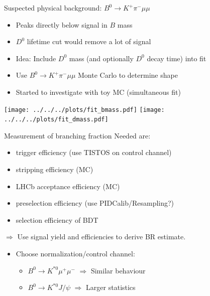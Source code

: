 \documentclass[compress,aspectratio=43]{beamer}
\begin{document}
\begin{frame}{Suspected physical background: $B^0\to K^+\pi^-\mu\mu$}
  \begin{itemize}
      \item Peaks directly below signal in $B$ mass
      \item $D^0$ lifetime cut would remove a lot of signal
      \item Idea: Include $D^0$ mass (and optionally $D^0$ decay time) into fit 
      \item Use $B^0\to K^+\pi^-\mu\mu$ Monte Carlo to determine shape
    \item Started to investigate with toy MC (simultaneous fit)
  \end{itemize}
  \centering
  \texttt{[image: ../../../plots/fit\_bmass.pdf]}
  \texttt{[image: ../../../plots/fit\_dmass.pdf]}
\end{frame}

\begin{frame}{Measurement of branching fraction}
  Needed are:
  \begin{itemize}
    \item trigger efficiency (use TISTOS on control channel)
    \item stripping efficiency (MC)
    \item LHCb acceptance efficiency (MC)
    \item preselection efficiency (use PIDCalib/Resampling?)
    \item selection efficiency of BDT
  \end{itemize}
  $\Rightarrow$ Use signal yield and efficiencies to derive BR estimate.
  \begin{itemize}
    \item Choose normalization/control channel:
      \begin{itemize}
        \item $B^0\to K^{*0}\mu^+\mu^-$ $\Rightarrow$ Similar behaviour
        \item $B^0 \to K^{*0}J\!/\!\psi$ $\Rightarrow$ Larger statistics
      \end{itemize}
  \end{itemize}
\end{frame}
\end{document}
